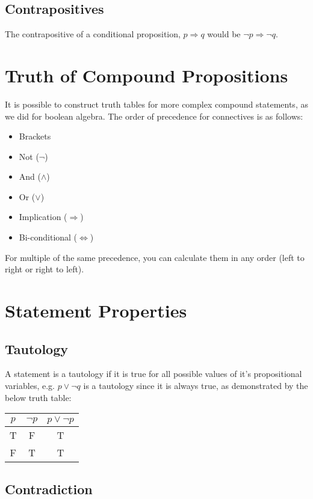 \subsection*{Contrapositives}

The contrapositive of a conditional proposition, $p \Rightarrow q$ would be $\neg p \Rightarrow \neg q$.

\section*{Truth of Compound Propositions}

It is possible to construct truth tables for more complex compound statements, as we did for boolean algebra. The order
 of precedence for connectives is as follows:
\begin{itemize}
  \item Brackets
  \item Not ($\neg$)
  \item And ($\wedge$)
  \item Or ($\vee$)
  \item Implication ($\Rightarrow$)
  \item Bi-conditional ($\Leftrightarrow$)
\end{itemize}
For multiple of the same precedence, you can calculate them in any order (left to right or right to left).

\section*{Statement Properties}

\subsection*{Tautology}

A statement is a tautology if it is true for all possible values of it's propositional variables, e.g. $p \vee \neg q$
 is a tautology since it is always true, as demonstrated by the below truth table:
\begin{table}[h]
  \centering
  \begin{tabular}{ c c c }
    $p$ & $\neg p$ & $p \vee \neg p$ \\
    \hline
    T & F & T \\
    F & T & T \\
  \end{tabular}
\end{table}

\subsection*{Contradiction}

